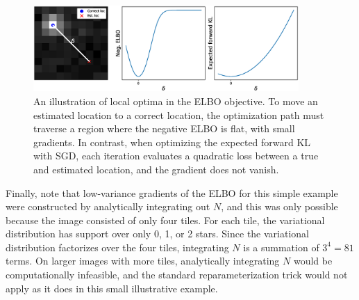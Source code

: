 \begin{figure}[!htb]
    \centering
    \includegraphics[width=0.9\textwidth]{figures_vg/elbo_vs_sleep/local_minima_cartoon.eps}
    \caption{An illustration of local optima in the ELBO objective.
    To move an estimated location to a correct location,
    the optimization path must traverse a region where the negative ELBO is flat, with small gradients.
    In contrast, when optimizing the expected forward KL with SGD, each iteration evaluates a
    quadratic loss between a true and estimated location,
    and the gradient does not vanish. }
    \label{fig:local_optima_cartoon}
\end{figure}

Finally, note that low-variance gradients of the ELBO for this simple example were constructed by analytically integrating out $N$, 
and this was only possible because the image consisted of only four tiles. 
For each tile, the variational distribution has support over only 0, 1, or 2 stars.
Since the variational distribution factorizes over the four tiles, integrating $N$ is a summation of $3^4 = 81$ terms.
On larger images with more tiles, analytically integrating $N$ would be computationally infeasible,
and the standard reparameterization trick would not apply as it does in this small illustrative example.




